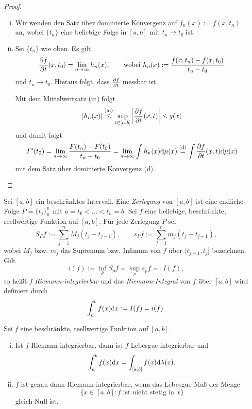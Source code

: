 \begin{proof}
 \begin{enumerate}[(i)]
  \item Wir wenden den Satz über dominierte Konvergenz auf $f_n(x) := f(x, t_n)$ an, wobei $\{ t_n \}$ eine beliebige Folge in $[a,b]$ mit $t_n \to t_0$ ist. 
  \item Sei $\{ t_n \}$ wie oben. Es gilt
  \[ \frac{\partial f}{\partial t}(x,t_0) = \lim_{n \to \infty} h_n(x), \qquad \text{wobei } h_n(x) := \frac{f(x,t_n) - f(x,t_0)}{t_n -t_0} \]
  und $t_n \to t_0$. Hieraus folgt, dass $\frac{\partial f}{\partial t}$ messbar ist.
  
  Mit dem Mittelwertsatz (m) folgt
  \[ |h_n(x)| \overset{(\text{m})}{\le} \sup_{t \in [a,b]} \left| \frac{\partial f}{\partial t} (x,t) \right| \le g(x) \]
  und damit folgt
  \[ F'(t_0) = \lim_{n \to \infty} \frac{F(t_n) - F(t_0)}{t_n - t_0} = \lim_{n \to \infty} \int h_n(x) \mathrm{d} \mu(x) \overset{(\text{d})}{=} \int \frac{\partial f}{\partial t} (x,t) \mathrm{d} \mu(x) \]
  mit dem Satz über dominierte Konvergenz (d). \qedhere
 \end{enumerate}
\end{proof}

\begin{prgp}
 Sei $[a,b]$ ein beschränktes Intervall. Eine \emph{Zerlegung} von $[a,b]$ ist eine endliche Folge $P = \{ t_j \}_0^n$ mit $a = t_0 < \ldots < t_n = b$. Sei $f$ eine beliebige, beschränkte, reellwertige Funktion auf $[a,b]$. Für jede Zerlegung $P$ sei
\[ S_P f := \sum_{j=1}^n M_j(t_j-t_{j-1}), \qquad s_P f := \sum_{j=1}^n m_j(t_j-t_{j-1}), \]
wobei $M_j$ bzw. $m_j$ das Supremum bzw. Infimum von $f$ über $(t_{j-1},t_j]$ bezeichnen. Gilt
\[ i(f) := \inf_{p} S_p f = \sup_p s_p f =: I(f), \]
so heißt $f$ \emph{Riemann-integrierbar} und das \emph{Riemann-Integral} von $f$ über $[a,b]$ wird definiert durch
\[ \int_a^b f(x) \mathrm{d} x := I(f) = i(f). \]
\end{prgp}

\begin{thm}
 Sei $f$ eine beschränkte, reellwertige Funktion auf $[a,b]$.
 \begin{enumerate}[(i)]
  \item Ist $f$ Riemann-integrierbar, dann ist $f$ Lebesgue-integrierbar und
  \[ \int_a^b f(x) \mathrm{d} x = \int_{[a,b]} f(x) \mathrm{d} \lambda(x). \]
  \item $f$ ist genau dann Riemann-integrierbar, wenn das Lebesgue-Maß der Menge
  \[ \{ x \in [a,b] : f \text{ ist nicht stetig in } x \} \]
  gleich Null ist.
 \end{enumerate}
\end{thm}

